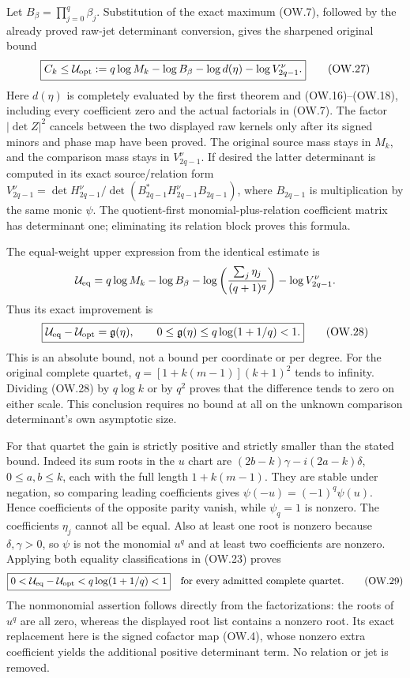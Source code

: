 \documentclass[11pt]{article}
\begin{document}
Let $B_\beta=\prod_{j=0}^q\beta_j$. Substitution of the exact
maximum (OW.7), followed by the already proved raw-jet determinant
conversion, gives the sharpened original bound
\[
 \boxed{C_k\le\mathcal U_{\rm opt}:=
 q\log M_k-\log B_\beta-\log d(\eta)-\log V_{2q-1}^\nu.}
 \tag{OW.27}
\]
Here $d(\eta)$ is completely evaluated by the first theorem and
(OW.16)--(OW.18), including every coefficient zero and the actual
factorials in (OW.7). The factor $|\det Z|^2$ cancels between
the two displayed raw kernels only after its signed minors and
phase map have been proved. The original source mass stays in
$M_k$, and the comparison mass stays in $V_{2q-1}^\nu$.
If desired the latter determinant is computed in its exact
source/relation form
$V_{2q-1}^\nu=\det H_{2q-1}^\nu/
\det(B_{2q-1}^*H_{2q-1}^\nu B_{2q-1})$, where
$B_{2q-1}$ is multiplication by the same monic $\psi$.
The quotient-first monomial-plus-relation coefficient matrix has
determinant one; eliminating its relation block proves this formula.

The equal-weight upper expression from the identical estimate is
\[
 \mathcal U_{\rm eq}=
 q\log M_k-\log B_\beta-\log\left(\frac{\sum_j\eta_j}{(q+1)^q}\right)
                     -\log V_{2q-1}^\nu.
\]
Thus its exact improvement is
\[
 \boxed{\mathcal U_{\rm eq}-\mathcal U_{\rm opt}
      =\mathfrak g(\eta),\qquad
       0\le\mathfrak g(\eta)\le q\log(1+1/q)<1.}        \tag{OW.28}
\]
This is an absolute bound, not a bound per coordinate or per degree.
For the original complete quartet,
$q=[1+k(m-1)](k+1)^2$ tends to infinity. Dividing (OW.28) by
$q\log k$ or by $q^2$ proves that the difference tends to zero
on either scale. This conclusion requires no bound at all on the
unknown comparison determinant's own asymptotic size.

For that quartet the gain is strictly positive and strictly smaller
than the stated bound. Indeed its sum roots in the $u$ chart are
$(2b-k)\gamma-i(2a-k)\delta$, $0\le a,b\le k$, each with
the full length $1+k(m-1)$. They are stable under negation, so
comparing leading coefficients gives
$\psi(-u)=(-1)^q\psi(u)$. Hence coefficients of the opposite
parity vanish, while $\psi_q=1$ is nonzero. The coefficients
$\eta_j$ cannot all be equal. Also at least one root is nonzero
because $\delta,\gamma>0$, so $\psi$ is not the monomial $u^q$
and at least two coefficients are nonzero. Applying both equality
classifications in (OW.23) proves
\[
 \boxed{0<\mathcal U_{\rm eq}-\mathcal U_{\rm opt}
          <q\log(1+1/q)<1}
 \quad\text{for every admitted complete quartet.}         \tag{OW.29}
\]
The nonmonomial assertion follows directly from the factorizations:
the roots of $u^q$ are all zero, whereas the displayed root list
contains a nonzero root. Its exact replacement here is the signed
cofactor map (OW.4), whose nonzero extra coefficient yields the
additional positive determinant term. No relation or jet is removed.
\end{document}
